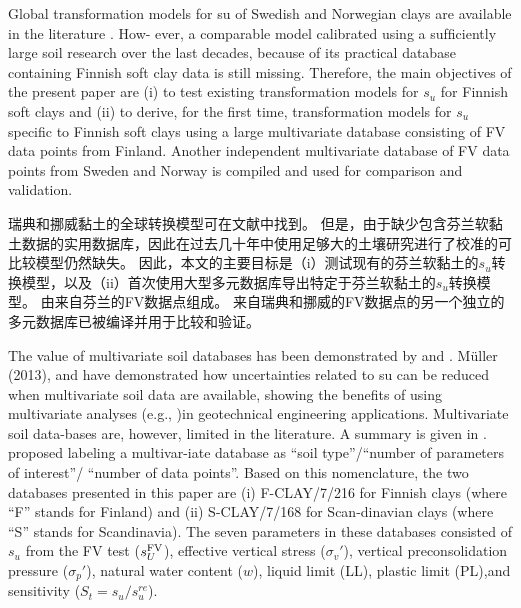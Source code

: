 \begin{ParaColumn}
    \switchcolumn*

    Global transformation models for su of Swedish and Norwegian clays are available in the literature \citep{Larsson1991,Larsson2007,Karlsrud20131273}. How- ever, a comparable model calibrated using a sufﬁciently large soil research over the last decades, because of its practical database containing Finnish soft clay data is still missing. Therefore, the main objectives of the present paper are (i) to test existing transformation models for $s_u$ for Finnish soft clays and (ii) to derive, for the ﬁrst time, transformation models for $s_u$ speciﬁc to Finnish soft clays using a large multivariate database consisting of FV data points from Finland. Another independent multivariate database of FV data points from Sweden and Norway is compiled and used for comparison and validation.

    \switchcolumn

    瑞典和挪威黏土的全球转换模型可在文献中找到\citep{Larsson1991,Larsson2007,Karlsrud20131273}。 但是，由于缺少包含芬兰软黏土数据的实用数据库，因此在过去几十年中使用足够大的土壤研究进行了校准的可比较模型仍然缺失。 因此，本文的主要目标是（i）测试现有的芬兰软黏土的$s_u$转换模型，以及（ii）首次使用大型多元数据库导出特定于芬兰软黏土的$s_u$转换模型。 由来自芬兰的FV数据点组成。 来自瑞典和挪威的FV数据点的另一个独立的多元数据库已被编译并用于比较和验证。

    \switchcolumn*

    The value of multivariate soil databases has been demonstrated by \citet{Ching201252,Ching2012522, Ching2013907,Ching2014663,Ching2014686} and \citet{Ching201477}. Müller (2013), \citet{Müller2014231,Müller2016603} and \citet{Prästings20161} have demonstrated how uncertainties related to su can be reduced when multivariate soil data are available, showing the beneﬁts of using multivariate analyses (e.g., \citealt{Ching201016})in geotechnical engineering applications. Multivariate soil data-bases are, however, limited in the literature. A summary is given in . \citet{Ching2014663} proposed labeling a multivar-iate database as “soil type”/“number of parameters of interest”/ “number of data points”. Based on this nomenclature, the two databases presented in this paper are (i) F-CLAY/7/216 for Finnish clays (where “F” stands for Finland) and (ii) S-CLAY/7/168 for Scan-dinavian clays (where “S” stands for Scandinavia). The seven parameters in these databases consisted of $s_u$ from the FV test ($s_U^{\rm{FV}}$), effective vertical stress ($\sigma_v'$), vertical preconsolidation pressure ($\sigma_p'$), natural water content ($w$), liquid limit (LL), plastic limit (PL),and sensitivity ($S_t=s_u/s_u^{re}$).


\end{ParaColumn}
